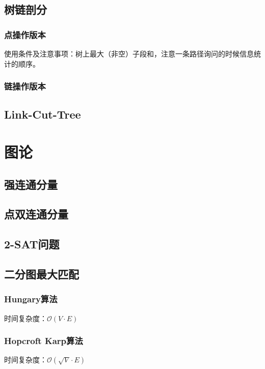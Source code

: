 \documentclass[openany, a4paper, 10pt]{book}
\begin{document}
\begin{spacing}{1.0}
		\section{树链剖分}
			\subsection{点操作版本}
				使用条件及注意事项：树上最大（非空）子段和，注意一条路径询问的时候信息统计的顺序。
				
			\subsection{链操作版本}
				
		\section{Link-Cut-Tree}
			
	\chapter{图论}
		\section{强连通分量}
			
		\section{点双连通分量}
				
		\section{2-SAT问题}
			
		\section{二分图最大匹配}
			\subsection{Hungary算法}
				时间复杂度：$\mathcal{O}(V \cdot E)$
				
			\subsection{Hopcroft Karp算法}
				时间复杂度：$\mathcal{O}(\sqrt{V} \cdot E)$
				

\end{spacing}
\end{document}
